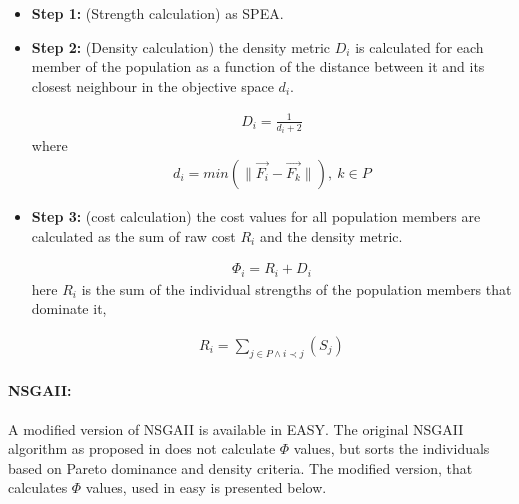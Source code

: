 \begin{itemize}
\item[]{\bf Step 1:}  (Strength calculation) as SPEA.

\item[]{\bf Step 2:}  (Density calculation) the density metric $D_i$ is calculated for each member of the population as a function of the distance between it and its closest neighbour in the objective space $d_i$.

\begin{eqnarray}
	D_i = \frac{1} {d_i+2} 
\end{eqnarray}
where
\begin{eqnarray}
	\nonumber
	d_i= min (\parallel \vec{F_i} - \vec{F_k} \parallel), ~ k \in P  
\end{eqnarray}


\item[]{\bf Step 3:}  (cost calculation) the cost values for all population members are calculated as the sum of raw cost $R_i$ and the density metric.

\begin{eqnarray}
	\Phi_i = R_i+D_i
\label{SPEAIIeq}
\end{eqnarray}
here $R_i$ is the sum of the individual strengths of the population members that dominate it,
  
\begin{eqnarray}
	\nonumber
	R_i=\sum _{j \in P \wedge i \prec j}(S_j)  
\end{eqnarray}  
\end{itemize}

\paragraph{NSGAII:} 
A modified version of NSGAII is available in EASY. The original NSGAII algorithm as proposed in \cite{Deb00a} does not calculate $\Phi$ values, but sorts the individuals based on Pareto dominance and density criteria. The modified version, that calculates $\Phi$ values, used in easy is presented below.  


